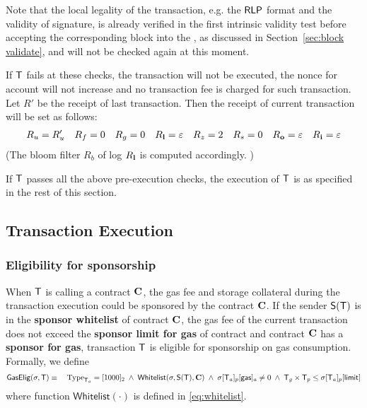 Note that the local legality of the transaction, 
e.g. the $\mathsf{RLP}$ format
and the validity of signature, 
is already verified in the first intrinsic validity test before accepting the corresponding block into the \name \tg, as discussed in Section~\ref{sec:block validate},
and will not be checked again at this moment.

If $\textsf{T}$ fails at these checks, the transaction will not be executed, the nonce for account will not increase and no transaction fee is charged for such transaction. Let $R'$ be the receipt of last transaction.
Then the receipt of current transaction will be set as follows:
\begin{align}
	R_u=R'_u && R_f=0 && R_g=0 && R_{\bf l}=\mathbb{\varepsilon} && R_z=2 && R_s=0 && R_{\bf o}=\mathbb{\varepsilon} && R_{\bf i}=\mathbb{\varepsilon}
\end{align}
%
(The bloom filter $R_b$ of log $R_{\bf l}$ is computed accordingly. 
)


If $\textsf{T}$ passes all the above pre-execution checks, the execution of $\textsf{T}$ is as specified in the rest of this section.

\subsection{Transaction Execution}

\subsubsection{Eligibility for sponsorship}

When $\textsf{T}$ is calling a contract $\mathbf{C}$, the gas fee and storage collateral during the transaction execution could be sponsored by the contract $\mathbf{C}$. If the sender $\mathsf{S}{\left({\textsf{T}} \right)}$ is in the {\bf sponsor whitelist} of contract $\mathbf{C}$, the gas fee of the current transaction does not exceed the {\bf sponsor limit for gas} of contract and contract $\mathbf{C}$ has a {\bf sponsor for gas}, transaction $\textsf{T}$ is eligible for sponsorship on gas consumption. Formally, we define 
\begin{align}
	\mathsf{GasElig}(\mathbf{\sigma},\textsf{T})\equiv \quad \mathrm{Type}_{\textsf{T}_a}=[1000]_2 \;\wedge\; \mathsf{Whitelist}(\mathbf{\sigma},\mathsf{S}{\left({\textsf{T}} \right)},\mathbf{C}) \;\wedge\; \mathbf{\sigma}[\textsf{T}_a]_p[\mathsf{gas}]_a\neq 0 \;\wedge\; \textsf{T}_g\times\textsf{T}_p \le \mathbf{\sigma}[\textsf{T}_a]_p[\mathsf{limit}] 
\end{align}
where function $\mathsf{Whitelist}(\cdot)$ is defined in \cref{eq:whitelist}. 

